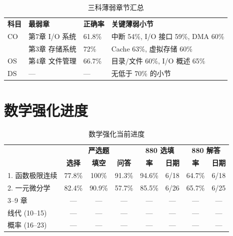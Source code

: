 \documentclass[12pt,a4paper]{ctexart}
\begin{document}
\begin{table}[H]
\centering
\begin{tabular}{llp{4cm}p{4cm}}
\rowcolor{headerbg}\textcolor{headerfg}{\textbf{科目}} & \textcolor{headerfg}{\textbf{最弱章}} & \textcolor{headerfg}{\textbf{正确率}} & \textcolor{headerfg}{\textbf{关键薄弱小节}} \\
CO & 第7章 I/O 系统  & 61.8\% & 中断 54\%, I/O 接口 59\%, DMA 60\% \\
   & 第3章 存储系统 & 72\%   & Cache 63\%, 虚拟存储 60\% \\
OS & 第4章 文件管理  & 66.7\% & 目录/文件 60\%, I/O 概述 65\% \\
DS & ---             & ---    & 无低于 70\% 的小节 \\
\end{tabular}
\caption{三科薄弱章节汇总}
\end{table}

\section{数学强化进度}

\begin{table}[H]
\centering
\begin{tabular}{lccccccc}
\rowcolor{headerbg}\textcolor{headerfg}{\multirow{2}{*}{\textbf{章节}}} & \multicolumn{3}{c}{\textcolor{headerfg}{\textbf{严选题}}} & \multicolumn{2}{c}{\textcolor{headerfg}{\textbf{880 选填}}} & \multicolumn{2}{c}{\textcolor{headerfg}{\textbf{880 解答}}} \\
\rowcolor{headerbg} & \textcolor{headerfg}{\textbf{选择}} & \textcolor{headerfg}{\textbf{填空}} & \textcolor{headerfg}{\textbf{问答}} & \textcolor{headerfg}{\textbf{率}} & \textcolor{headerfg}{\textbf{日期}} & \textcolor{headerfg}{\textbf{率}} & \textcolor{headerfg}{\textbf{日期}} \\
1. 函数极限连续 & 77.8\% & 100\% & 91.3\% & 94.6\% & 6/18 & 64.7\% & 6/18 \\
2. 一元微分学   & 82.4\% & 90.9\% & 57.7\% & 85.5\% & 6/26 & 65.7\% & 6/25 \\
3--9 章         & --- & --- & --- & --- & --- & --- & --- \\
\midrule
线代 (10--15)  & --- & --- & --- & --- & --- & --- & --- \\
概率 (16--23)  & --- & --- & --- & --- & --- & --- & --- \\
\end{tabular}
\caption{数学强化当前进度}
\end{table}
\end{document}
